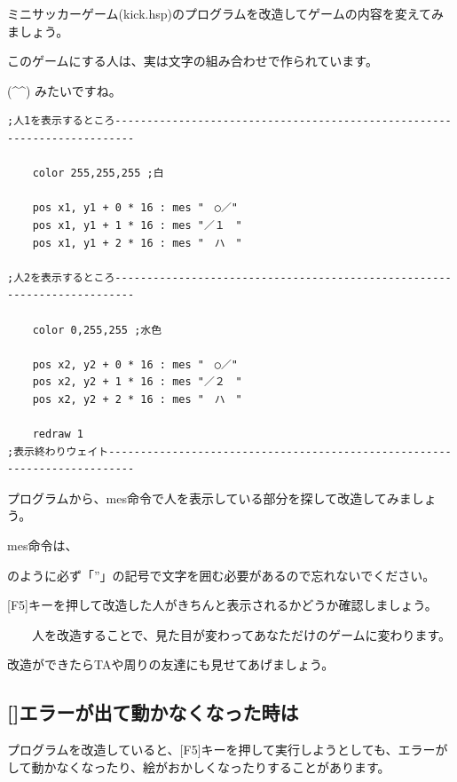 \documentclass[text04.tex]{subfiles}
\begin{document}
\exampleinduction

ミニサッカーゲーム(kick.hsp)のプログラムを改造してゲームの内容を変えてみましょう。

このゲームにする人は、実は文字の組み合わせで作られています。

(\^{}\^{}) みたいですね。


\begin{lstlisting}[firstnumber=64,caption=ミニサッカーゲームのプログラムの一部]
;人1を表示するところ-------------------------------------------------------------------------

    color 255,255,255 ;白

    pos x1, y1 + 0 * 16 : mes "　○／"
    pos x1, y1 + 1 * 16 : mes "／１　"
    pos x1, y1 + 2 * 16 : mes "　ハ　"

;人2を表示するところ-------------------------------------------------------------------------

    color 0,255,255 ;水色

    pos x2, y2 + 0 * 16 : mes "　○／"
    pos x2, y2 + 1 * 16 : mes "／２　"
    pos x2, y2 + 2 * 16 : mes "　ハ　"

    redraw 1
;表示終わりウェイト--------------------------------------------------------------------------
\end{lstlisting}



プログラムから、mes命令で人を表示している部分を探して改造してみましょう。

mes命令は、



のように必ず「”」の記号で文字を囲む必要があるので忘れないでください。

\exampleanswer


[F5]キーを押して改造した人がきちんと表示されるかどうか確認しましょう。

\ \ \ \ 人を改造することで、見た目が変わってあなただけのゲームに変わります。

改造ができたらTAや周りの友達にも見せてあげましょう。

\clearpage

\subsection*{[]エラーが出て動かなくなった時は}

プログラムを改造していると、[F5]キーを押して実行しようとしても、エラーがして動かなくなったり、絵がおかしくなったりすることがあります。
\end{document}

